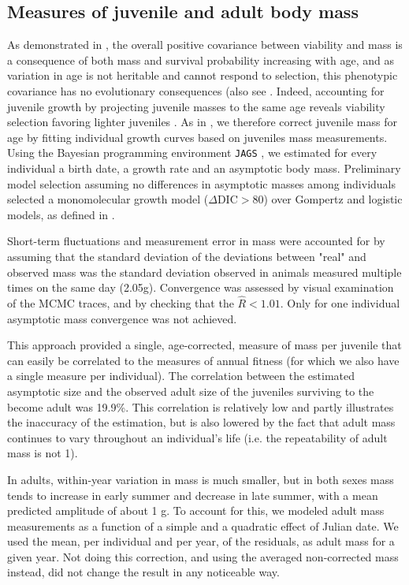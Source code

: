 \subsection*{Measures of juvenile and adult body mass}
As demonstrated in \cite{Bonnet2016}, the overall positive covariance between viability and mass is a consequence of both mass and survival probability increasing with age, and as variation in age is not heritable and cannot respond to selection, this phenotypic covariance has no evolutionary consequences (also see \parencite{VanNoordwijk1988a, Rausher1992}. Indeed, accounting for juvenile growth by projecting juvenile masses to the same age reveals viability selection favoring lighter juveniles \parencite{Bonnet2016}. As in \parencite{Bonnet2016}, we therefore correct juvenile mass for age by fitting individual growth curves based on juveniles mass measurements. Using the Bayesian programming environment \texttt{JAGS} \cite{Plummer2003}, we estimated for every individual a birth date, a growth rate and an asymptotic body mass. Preliminary model selection assuming no differences in asymptotic masses among individuals selected a monomolecular growth model ($\Delta \mathrm{DIC} > 80$) over Gompertz and logistic models, as defined in \cite{English2012}.

Short-term fluctuations and measurement error in mass were accounted for by assuming that the standard deviation of the deviations between "real" and observed mass was the standard deviation observed in animals measured multiple times on the same day (2.05g).
Convergence was assessed by visual examination of the MCMC traces, and by checking that the $\hat{R}<1.01$. Only for one individual asymptotic mass convergence was not achieved.

This approach provided a single, age-corrected, measure of mass per juvenile that can easily be correlated to the measures of annual fitness (for which we also have a single measure per individual).
The correlation between the estimated asymptotic size and the observed adult size of the juveniles surviving to the become adult was 19.9\%. This correlation is relatively low and partly illustrates the inaccuracy of the estimation, but is also lowered by the fact that adult mass continues to vary throughout an individual's life (i.e. the repeatability of adult mass is not 1).

In adults, within-year variation in mass is much smaller, but in both sexes mass tends to increase in early summer and decrease in late summer, with a mean predicted amplitude of about 1 g. To account for this, we modeled adult mass measurements as a function of a simple and a quadratic effect of Julian date. We used the mean, per individual and per year, of the residuals, as adult mass for a given year. Not doing this correction, and using the averaged non-corrected mass instead, did not change the result in any noticeable way.

